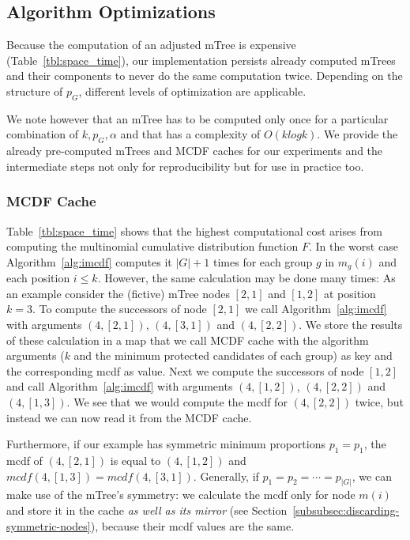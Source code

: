 \subsection{Algorithm Optimizations}
Because the computation of an adjusted mTree is expensive (Table~\ref{tbl:space_time}), our implementation persists already computed mTrees and their components to never do the same computation twice. 
%
Depending on the structure of $p_G$, different levels of optimization are applicable.

We note however that an mTree has to be computed only once for a particular combination of $k, p_G, \alpha$ and that \algoFAIR has a complexity of $O(k log k)$.
%
We provide the already pre-computed mTrees and MCDF caches for our experiments and the intermediate steps not only for reproducibility but for use in practice too.

\subsubsection{MCDF Cache}\label{subsubsec:mcdf-cache}
Table~\ref{tbl:space_time} shows that the highest computational cost arises from computing the multinomial cumulative distribution function $F$. 
%
In the worst case Algorithm~\ref{alg:imcdf} computes it $|G|+1$ times for each group $g$ in $m_g(i)$ and each position $i\leq k$.
%
However, the same calculation may be done many times:
%
As an example consider the (fictive) mTree nodes $[2,1]$ and $[1,2]$ at position $k=3$. 
%
To compute the successors of node $[2,1]$ we call Algorithm~\ref{alg:imcdf} with arguments $(4,[2,1])$, $(4,[3,1])$ and $(4,[2,2])$. 
%
We store the results of these calculation in a map that we call MCDF cache with the algorithm arguments ($k$ and the minimum protected candidates of each group) as key and the corresponding mcdf as value.
%
Next we compute the successors of node $[1,2]$ and call Algorithm~\ref{alg:imcdf} with arguments $(4,[1,2])$, $(4,[2,2])$ and $(4,[1,3])$. 
%
We see that we would compute the mcdf for $(4,[2,2])$ twice, but instead we can now read it from the MCDF cache.

Furthermore, if our example has symmetric minimum proportions $p_1 = p_1$, the mcdf of $(4,[2,1])$ is equal to $(4,[1,2])$ and $\textit{mcdf}(4,[1,3]) = \textit{mcdf}(4,[3,1])$. 
%
Generally, if $p_1 = p_2 = \cdots = p_{|G|}$, we can make use of the mTree's symmetry: we calculate the mcdf only for node $m(i)$ and store it in the cache \emph{as well as its mirror} (see Section~\ref{subsubsec:discarding-symmetric-nodes}), because their mcdf values are the same.

